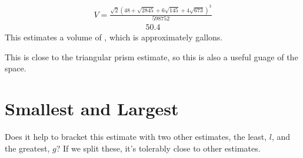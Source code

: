 \documentclass[letterpaper,10pt,english]{sphinxmanual}
\begin{document}
\begin{sphinxVerbatim}[commandchars=\\\{\}]
  
 
\end{sphinxVerbatim}
\begin{equation*}
\begin{split}\displaystyle V = \frac{\sqrt{2} \left(48 + \sqrt{2845} + 6 \sqrt{145} + 4 \sqrt{673}\right)^{3}}{598752}\end{split}
\end{equation*}\begin{equation*}
\begin{split}\displaystyle 50.4\end{split}
\end{equation*}
\sphinxAtStartPar
This estimates a volume of , which is approximately  gallons.

\sphinxAtStartPar
This is close to the triangular prism estimate, so this is also a useful guage of the space.


\section{Smallest and Largest}
\label{\detokenize{tetrahedron:smallest-and-largest}}
\sphinxAtStartPar
Does it help to bracket this estimate with two other estimates, the least, \(l\), and the greatest, \(g\)? If we split these, it’s tolerably close to other estimates.

\begin{sphinxVerbatim}[commandchars=\\\{\}]
  \PYG{p}{[}     \PYG{p}{]}
  \PYG{p}{[}     \PYG{p}{]}
        
        
\end{sphinxVerbatim}
\end{document}

